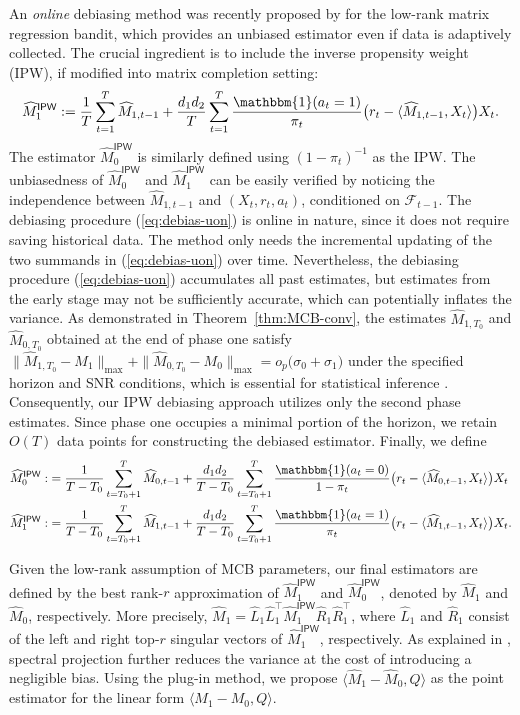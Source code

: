 \documentclass[12pt]{article}
\def\calF{{\mathcal F}}
\def\hat{\widehat}
\def\uipw{\textsf{IPW}}
\theoremstyle{plain}
\begin{document}
An \emph{online} debiasing method was recently proposed by \cite{han2022online} for the low-rank matrix regression bandit, which provides an unbiased estimator even if data is adaptively collected. The crucial ingredient is to include the inverse propensity weight (IPW), if modified into matrix completion setting:
\begin{align}\label{eq:debias-uon}
\hat M_{1}^{\uipw}:=\frac{1}{T}\sum_{t=1}^ T\hat M_{1, t-1}+\frac{d_1d_2}{T}\sum_{t=1}^T \frac{\mathbbm{1}(a_t=1)}{\pi_t} \big(r_t-\langle \hat M_{1, t-1}, X_t\rangle\big)X_t.
\end{align}
The estimator $\hat M_0^{\uipw}$ is similarly defined using $(1-\pi_t)^{-1}$ as the IPW. The unbiasedness of $\hat M_0^{\uipw}$ and $\hat M_1^{\uipw}$ can be easily verified by noticing the independence between $\hat M_{1,t-1}$ and $(X_t, r_t, a_t)$, conditioned on $\calF_{t-1}$. The debiasing procedure (\ref{eq:debias-uon}) is online in nature, since it does not require saving historical data. The method only needs the incremental updating of the two summands in (\ref{eq:debias-uon}) over time. Nevertheless, the debiasing procedure (\ref{eq:debias-uon}) accumulates all past estimates, but estimates from the early stage may not be sufficiently accurate, which can potentially inflates the variance.  As demonstrated in Theorem~\ref{thm:MCB-conv}, the estimates $\hat M_{1, T_0}$ and $\hat M_{0, T_0}$ obtained at the end of phase one satisfy $\|\hat M_{1, T_0}-M_1\|_{\max}+\|\hat M_{0, T_0}-M_0\|_{\max}=o_p\big(\sigma_0+ \sigma_1\big)$ under the specified horizon and SNR conditions, which is essential for statistical inference \citep{xia2021statistical}. Consequently, our IPW debiasing approach utilizes only the second phase estimates. Since phase one occupies a minimal portion of the horizon, we retain $O(T)$
 data points for constructing the debiased estimator.  Finally, we define 
\begin{align}\label{eq:debias-aw}
\hat M_0^{\uipw}:&= \frac{1}{T-T_0}\sum_{t=T_0+1}^ T\hat M_{0, t-1}+\frac{d_1d_2}{T-T_0}\sum_{t=T_0+1}^T \frac{\mathbbm{1}(a_t=0)}{1-\pi_t} \big(r_t-\langle \hat M_{0, t-1}, X_t\rangle\big)X_t\notag\\
\hat M_1^{\uipw}:&= \frac{1}{T-T_0}\sum_{t=T_0+1}^ T\hat M_{1, t-1}+\frac{d_1d_2}{T-T_0}\sum_{t=T_0+1}^T \frac{\mathbbm{1}(a_t=1)}{\pi_t} \big(r_t-\langle \hat M_{1, t-1}, X_t\rangle\big)X_t.
\end{align}

Given the low-rank assumption of MCB parameters, our final estimators are defined by the best rank-$r$ approximation of $\hat M_1^{\uipw}$ and $\hat M_0^{\uipw}$, denoted by $\hat M_1$ and $\hat M_0$, respectively. More precisely, $\hat M_1=\hat L_1\hat L_1^{\top}\hat M_1^{\uipw} \hat R_1\hat R_1^{\top}$,  where $\hat L_1$ and $\hat R_1$ consist of the left and right top-$r$ singular vectors of $\hat M_1^{\uipw}$, respectively. As explained in \cite{xia2021statistical}, spectral projection further reduces the variance at the cost of introducing a negligible bias.  Using the plug-in method, we propose $\langle \hat M_1-\hat M_0, Q\rangle$ as the point estimator for the linear form $\langle M_1- M_0, Q\rangle$. 
\end{document}
